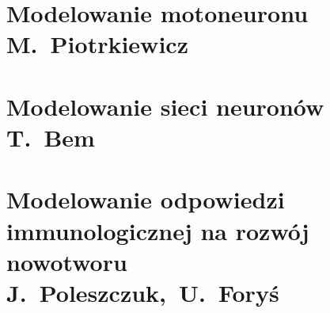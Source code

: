 \documentclass[11pt,a4paper,twoside,openright,final]{memoir}
\begin{document}
			\chapter[Modelowanie motoneuronu]{Modelowanie motoneuronu\\{\Large M.~Piotrkiewicz}}
			
			\chapter[Modelowanie sieci neuronów]{Modelowanie sieci neuronów\\{\Large T.~Bem}}
			
			\chapter[Modelowanie odpowiedzi immunologicznej na rozwój nowotworu]{Modelowanie odpowiedzi immunologicznej na rozwój nowotworu\\{\Large J.~Poleszczuk,~U.~Foryś}}
	
			
			

	\backmatter
		
\end{document}
